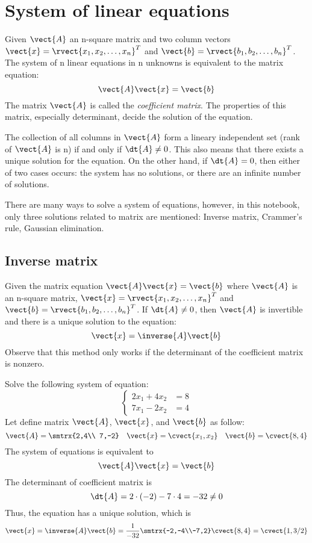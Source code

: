 \section{System of linear equations}
\label{linear-eq}
Given $\vect{A}$ an n-square matrix and two column vectors $\vect{x}=\rvect{x_1,x_2,\ldots ,x_n}^T$ and $\vect{b}=\rvect{b_1,b_2,\ldots ,b_n}^T$. The system of n linear equations in n unknowns is equivalent to the matrix equation: \[ \vect{A}\vect{x}=\vect{b} \]
The matrix $\vect{A}$ is called the \emph{coefficient matrix}. The properties of this matrix, especially determinant, decide the solution of the equation.\par The collection of all columns in $\vect{A}$ form a lineary independent set (rank of $\vect{A}$ is n) if and only if $\dt{A}\neq 0$. This also means that there exists a unique solution for the equation. On the other hand, if $\dt{A}=0$, then either of two cases occurs: the system has no solutions, or there are an infinite number of solutions.\par There are many ways to solve a system of equations, however, in this notebook, only three solutions related to matrix are mentioned: Inverse matrix, Crammer's rule, Gaussian elimination.
\subsection{Inverse matrix}
Given the matrix equation $\vect{A}\vect{x}=\vect{b}$ where $\vect{A}$ is an n-square matrix, $\vect{x}=\rvect{x_1,x_2,\ldots ,x_n}^T$ and $\vect{b}=\rvect{b_1,b_2,\ldots ,b_n}^T$. If  $\dt{A}\neq 0$, then $\vect{A}$ is invertible and there is a unique solution to the equation: \[ \vect{x}=\inverse{A}\vect{b} \]
Observe that this method only works if the determinant of the coefficient matrix is nonzero.
\begin{example}
Solve the following system of equation:
\begin{equation}
\begin{cases}
    2x_1+4x_2 &= 8 \\
    7x_1-2x_2 &= 4
\end{cases}
\label{apple}
\end{equation}
Let define matrix $\vect{A}$, $\vect{x}$, and $\vect{b}$ as follow:
\[ \vect{A}=\smtrx{2,4\\ 7,-2} \quad \vect{x}=\cvect{x_1,x_2} \quad \vect{b}=\cvect{8,4} \]
The system of equations is equivalent to 
\begin{equation*}
\vect{A}\vect{x}=\vect{b}
\end{equation*}
The determinant of coefficient matrix is \[ \dt{A}=2\cdot (-2) - 7\cdot 4= -32 \neq 0 \] Thus, the equation has a unique solution, which is
\[ \vect{x}=\inverse{A}\vect{b}=\frac{1}{-32} \smtrx{-2,-4\\-7,2}\cvect{8,4}=\cvect{1,3/2} \]
\end{example}
